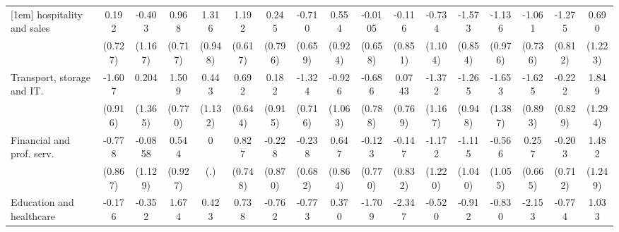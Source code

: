 {\begin{tabular}{l*{16}{c}}
[1em]
hospitality and sales&       0.192         &      -0.403         &       0.968         &       1.316         &       1.192         &       0.245         &      -0.710         &       0.554         &     -0.0105         &      -0.116         &      -0.734         &      -1.573         &      -1.136         &      -1.061         &      -1.275         &       0.690         \\
                    &     (0.727)         &     (1.167)         &     (0.717)         &     (0.948)         &     (0.617)         &     (0.796)         &     (0.659)         &     (0.924)         &     (0.658)         &     (0.851)         &     (1.104)         &     (0.854)         &     (0.976)         &     (0.736)         &     (0.812)         &     (1.223)         \\
[1em]
Transport, storage and IT.&      -1.607         &       0.204         &       1.509\sym{*}  &       0.443         &       0.692         &       0.182         &      -1.324         &      -0.926         &      -0.686         &      0.0743         &      -1.372         &      -1.265         &      -1.653         &      -1.625         &      -0.222         &       1.849         \\
                    &     (0.916)         &     (1.365)         &     (0.770)         &     (1.132)         &     (0.644)         &     (0.915)         &     (0.716)         &     (1.063)         &     (0.788)         &     (0.769)         &     (1.167)         &     (0.948)         &     (1.387)         &     (0.893)         &     (0.829)         &     (1.294)         \\
[1em]
Financial and prof. serv.&      -0.778         &     -0.0858         &       0.544         &           0         &       0.827         &      -0.228         &      -0.238         &       0.647         &      -0.123         &      -0.147         &      -1.172         &      -1.115         &      -0.566         &       0.257         &      -0.203         &       1.482         \\
                    &     (0.867)         &     (1.129)         &     (0.927)         &         (.)         &     (0.748)         &     (0.870)         &     (0.682)         &     (0.864)         &     (0.770)         &     (0.832)         &     (1.220)         &     (1.040)         &     (1.055)         &     (0.665)         &     (0.712)         &     (1.249)         \\
[1em]
Education and healthcare&      -0.176         &      -0.352         &       1.674\sym{*}  &       0.423         &       0.738         &      -0.762         &      -0.773         &       0.370         &      -1.709         &      -2.347\sym{*}  &      -0.520         &      -0.912         &      -0.830         &      -2.153\sym{*}  &      -0.774         &       1.033         \\

\end{tabular}}
